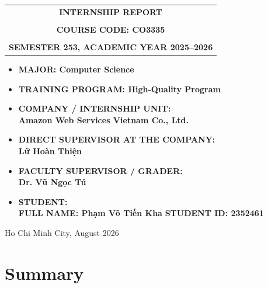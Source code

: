\documentclass[a4paper]{article}
\begin{document}
\begin{titlepage}
\begin{center}
\begin{tabular}{c}
\multicolumn{1}{c}{\textbf{{\LARGE INTERNSHIP REPORT}}}\\
\\{\textbf{{\Large COURSE CODE: CO3335}}}
\\
\\
\textbf{\Large SEMESTER 253, ACADEMIC YEAR 2025--2026} \\
\end{tabular}
\end{center}
\vspace{0.5cm}
\begin{itemize}
\renewcommand\labelitemi{--}
    \item \Large \textbf{MAJOR: Computer Science}
    \item \Large \textbf{TRAINING PROGRAM: High-Quality Program}
\end{itemize}
\vspace{0.7cm}
\begin{itemize}
\renewcommand\labelitemi{--}
    \item \Large \textbf{COMPANY / INTERNSHIP UNIT:}
    \\ \Large \textbf{Amazon Web Services Vietnam Co., Ltd.}
    \item \Large \textbf{DIRECT SUPERVISOR AT THE COMPANY:}
    \\ \Large \textbf{Lữ Hoàn Thiện}
    \item \Large \textbf{FACULTY SUPERVISOR / GRADER:}
    \\ \Large \textbf{Dr. Vũ Ngọc Tú}
    \item \Large \textbf{STUDENT:}
    \\ \Large \textbf{FULL NAME: Phạm Võ Tiến Kha} \textbf{STUDENT ID: 2352461}
\end{itemize}
\vspace{0.5cm}
\begin{center}
{\Large Ho Chi Minh City, August 2026}
\end{center}
\end{titlepage}

\newpage
\tableofcontents
\newpage





\newpage
\section{Summary}
\end{document}
